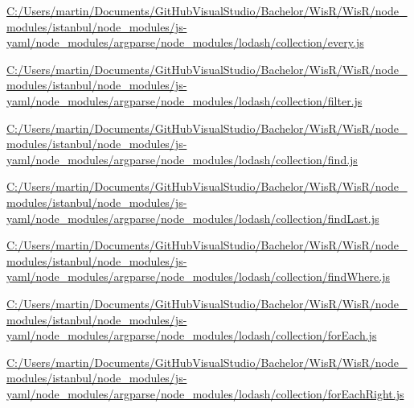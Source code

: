 \begin{DoxyCompactItemize}
\item 
\hyperlink{_c_1_2_users_2martin_2_documents_2_git_hub_visual_studio_2_bachelor_2_wis_r_2_wis_r_2node_module8343757c37237c068cb9cbddf7c21f3a}{C\+:/\+Users/martin/\+Documents/\+Git\+Hub\+Visual\+Studio/\+Bachelor/\+Wis\+R/\+Wis\+R/node\+\_\+modules/istanbul/node\+\_\+modules/js-\/yaml/node\+\_\+modules/argparse/node\+\_\+modules/lodash/collection/every.\+js}
\item 
\hyperlink{_c_1_2_users_2martin_2_documents_2_git_hub_visual_studio_2_bachelor_2_wis_r_2_wis_r_2node_module8bf19159f08a35f71152eec9f7ba8dad}{C\+:/\+Users/martin/\+Documents/\+Git\+Hub\+Visual\+Studio/\+Bachelor/\+Wis\+R/\+Wis\+R/node\+\_\+modules/istanbul/node\+\_\+modules/js-\/yaml/node\+\_\+modules/argparse/node\+\_\+modules/lodash/collection/filter.\+js}
\item 
\hyperlink{_c_1_2_users_2martin_2_documents_2_git_hub_visual_studio_2_bachelor_2_wis_r_2_wis_r_2node_module80ef4f68e2bb1b3612825fa0b9a80986}{C\+:/\+Users/martin/\+Documents/\+Git\+Hub\+Visual\+Studio/\+Bachelor/\+Wis\+R/\+Wis\+R/node\+\_\+modules/istanbul/node\+\_\+modules/js-\/yaml/node\+\_\+modules/argparse/node\+\_\+modules/lodash/collection/find.\+js}
\item 
\hyperlink{_c_1_2_users_2martin_2_documents_2_git_hub_visual_studio_2_bachelor_2_wis_r_2_wis_r_2node_module76adbbb8614df4c8c57117419608d3f1}{C\+:/\+Users/martin/\+Documents/\+Git\+Hub\+Visual\+Studio/\+Bachelor/\+Wis\+R/\+Wis\+R/node\+\_\+modules/istanbul/node\+\_\+modules/js-\/yaml/node\+\_\+modules/argparse/node\+\_\+modules/lodash/collection/find\+Last.\+js}
\item 
\hyperlink{_c_1_2_users_2martin_2_documents_2_git_hub_visual_studio_2_bachelor_2_wis_r_2_wis_r_2node_module89660d33641a4156db3122f385a88d14}{C\+:/\+Users/martin/\+Documents/\+Git\+Hub\+Visual\+Studio/\+Bachelor/\+Wis\+R/\+Wis\+R/node\+\_\+modules/istanbul/node\+\_\+modules/js-\/yaml/node\+\_\+modules/argparse/node\+\_\+modules/lodash/collection/find\+Where.\+js}
\item 
\hyperlink{_c_1_2_users_2martin_2_documents_2_git_hub_visual_studio_2_bachelor_2_wis_r_2_wis_r_2node_moduleffaeb34ec877ee6de115b4c8ca4b5493}{C\+:/\+Users/martin/\+Documents/\+Git\+Hub\+Visual\+Studio/\+Bachelor/\+Wis\+R/\+Wis\+R/node\+\_\+modules/istanbul/node\+\_\+modules/js-\/yaml/node\+\_\+modules/argparse/node\+\_\+modules/lodash/collection/for\+Each.\+js}
\item 
\hyperlink{_c_1_2_users_2martin_2_documents_2_git_hub_visual_studio_2_bachelor_2_wis_r_2_wis_r_2node_moduleaddd0de1ccce20620392b6f4399bbb98}{C\+:/\+Users/martin/\+Documents/\+Git\+Hub\+Visual\+Studio/\+Bachelor/\+Wis\+R/\+Wis\+R/node\+\_\+modules/istanbul/node\+\_\+modules/js-\/yaml/node\+\_\+modules/argparse/node\+\_\+modules/lodash/collection/for\+Each\+Right.\+js}

\end{DoxyCompactItemize}

